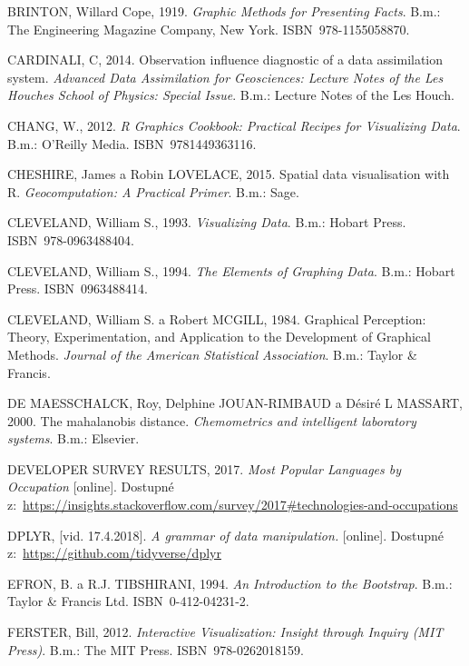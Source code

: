 \documentclass[12pt,]{article}
\begin{document}
\hypertarget{ref-brinton_1919}{}
BRINTON, Willard Cope, 1919. \emph{Graphic Methods for Presenting
Facts}. B.m.: The Engineering Magazine Company, New York.
ISBN~978-1155058870.

\hypertarget{ref-leverages_regression}{}
CARDINALI, C, 2014. Observation influence diagnostic of a data
assimilation system. \emph{Advanced Data Assimilation for Geosciences:
Lecture Notes of the Les Houches School of Physics: Special Issue}.
B.m.: Lecture Notes of the Les Houch.

\hypertarget{ref-chang2012}{}
CHANG, W., 2012. \emph{R Graphics Cookbook: Practical Recipes for
Visualizing Data}. B.m.: O'Reilly Media. ISBN~9781449363116.

\hypertarget{ref-spatial}{}
CHESHIRE, James a Robin LOVELACE, 2015. Spatial data visualisation with
R. \emph{Geocomputation: A Practical Primer}. B.m.: Sage.

\hypertarget{ref-cleveland1993}{}
CLEVELAND, William S., 1993. \emph{Visualizing Data}. B.m.: Hobart
Press. ISBN~978-0963488404.

\hypertarget{ref-cleveland1994}{}
CLEVELAND, William S., 1994. \emph{The Elements of Graphing Data}. B.m.:
Hobart Press. ISBN~0963488414.

\hypertarget{ref-cleveland_mcgill}{}
CLEVELAND, William S. a Robert MCGILL, 1984. Graphical Perception:
Theory, Experimentation, and Application to the Development of Graphical
Methods. \emph{Journal of the American Statistical Association}. B.m.:
Taylor \& Francis.

\hypertarget{ref-mbdist2}{}
DE MAESSCHALCK, Roy, Delphine JOUAN-RIMBAUD a Désiré L MASSART, 2000.
The mahalanobis distance. \emph{Chemometrics and intelligent laboratory
systems}. B.m.: Elsevier.

\hypertarget{ref-stackover}{}
DEVELOPER SURVEY RESULTS, 2017. \emph{Most Popular Languages by
Occupation} {[}online{]}. Dostupné
z:~\url{https://insights.stackoverflow.com/survey/2017\#technologies-and-occupations}

\hypertarget{ref-dplyr}{}
DPLYR, {[}vid. 17.4.2018{]}. \emph{A grammar of data manipulation.}
{[}online{]}. Dostupné z:~\url{https://github.com/tidyverse/dplyr}

\hypertarget{ref-bootstrap}{}
EFRON, B. a R.J. TIBSHIRANI, 1994. \emph{An Introduction to the
Bootstrap}. B.m.: Taylor \& Francis Ltd. ISBN~0-412-04231-2.

\hypertarget{ref-ferster}{}
FERSTER, Bill, 2012. \emph{Interactive Visualization: Insight through
Inquiry (MIT Press)}. B.m.: The MIT Press. ISBN~978-0262018159.
\end{document}
